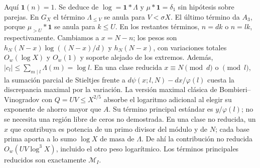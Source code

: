 \documentclass[11pt,a4paper]{article}
\newcommand{\B}[2]{#2}
\newcommand{\B}[2]{#1}
\newcommand{\one}{\mathbf 1}
\begin{document}
\B{Here $\one(n)=1$. It follows from $\log=\one*\Lambda$ and $\mu*\one=\delta_1$, with no assumptions on pairs. In $G_X$ the term $\Lambda_{\le V}$ vanishes for $V<\sigma X$. The last term is $A_3$, since $\mu_{>U}*\one$ vanishes for $k\le U$. In the remaining terms, $n=dk$ or $n=lk$, respectively. Change variables to $x=N-n$; the weights are $h_N(N-x)\log((N-x)/d)$ and $h_N(N-x)$, with total variations $O_w(\log X)$ and $O_w(1)$, and support away from the endpoints. Also $|c_l|\le\sum_{m\mid l}\Lambda(m)=\log l$. On a reduced class $x\equiv N\pmod d$ or $\pmod l$, Stieltjes partial summation against $d\psi(x;l,N)-dx/\varphi(l)$ costs the maximal discrepancy times the variation. The maximal classical Bombieri--Vinogradov estimate \cite{mv,bv} at $Q=UV\le X^{2/5}$ absorbs the extra logarithm by choosing its saving exponent larger than $A$. Its standard main term is $y/\varphi(l)$; no unproved zero-free region is required. On a nonreduced class, a contributing $x$ must be a power of a prime dividing the modulus and $N$; each such prime base contributes at most $\log X$ of $\Lambda$-mass. Thus the nonreduced contribution is $O_w(UV\log^3 X)$ after including the other log weight. The reduced main terms are exactly $\mathcal M_I$.}{Aquí $\one(n)=1$. Se deduce de $\log=\one*\Lambda$ y $\mu*\one=\delta_1$ sin hipótesis sobre parejas. En $G_X$ el término $\Lambda_{\le V}$ se anula para $V<\sigma X$. El último término da $A_3$, porque $\mu_{>U}*\one$ se anula para $k\le U$. En los restantes términos, $n=dk$ o $n=lk$, respectivamente. Cambiamos a $x=N-n$; los pesos son $h_N(N-x)\log((N-x)/d)$ y $h_N(N-x)$, con variaciones totales $O_w(\log X)$ y $O_w(1)$ y soporte alejado de los extremos. Además, $|c_l|\le\sum_{m\mid l}\Lambda(m)=\log l$. En una clase reducida $x\equiv N\pmod d$ o $\pmod l$, la sumación parcial de Stieltjes frente a $d\psi(x;l,N)-dx/\varphi(l)$ cuesta la discrepancia maximal por la variación. La versión maximal clásica de Bombieri--Vinogradov \cite{mv,bv} con $Q=UV\le X^{2/5}$ absorbe el logaritmo adicional al elegir su exponente de ahorro mayor que $A$. Su término principal estándar es $y/\varphi(l)$; no se necesita una región libre de ceros no demostrada. En una clase no reducida, un $x$ que contribuya es potencia de un primo divisor del módulo y de $N$; cada base prima aporta a lo sumo $\log X$ de masa de $\Lambda$. De ahí la contribución no reducida $O_w(UV\log^3 X)$, incluido el otro peso logarítmico. Los términos principales reducidos son exactamente $\mathcal M_I$.}
\end{document}
